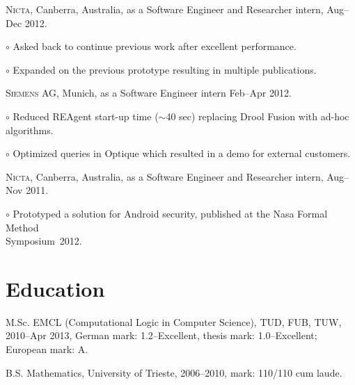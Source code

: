 \documentclass[letterpaper]{article}
\renewenvironment{itemize}{
  \begin{list}{}{
    \setlength{\leftmargin}{1.5em}
  }
}{
  \end{list}
}
\newenvironment{no-indent-itemize}{
  \begin{list}{}{
    \setlength{\leftmargin}{0em}
  }
}{
  \end{list}
}
\def\tilde{$\scriptstyle\sim$}
\def\bullet{$\circ$\xspace}
\begin{document}
\begin{no-indent-itemize}
  \item \textsc{Nicta}, Canberra, Australia, as a Software Engineer and Researcher intern, Aug--Dec 2012. 
  \begin{itemize}
	\item\bullet Asked back to continue previous work after excellent performance.
	\item\bullet Expanded on the previous prototype resulting in multiple publications.
  \end{itemize}
  \item \textsc{Siemens AG}, Munich, as a Software Engineer intern Feb--Apr 2012.
  \begin{itemize}
	\item\bullet Reduced REAgent start-up time (\tilde 40 sec) replacing Drool Fusion with 
          ad-hoc algorithms.
	\item\bullet Optimized queries in Optique which resulted in a demo for external customers.
  \end{itemize}
  \item \textsc{Nicta}, Canberra, Australia, as a Software Engineer and Researcher intern, Aug--Nov 2011. 
  \begin{itemize}
	\item\bullet Prototyped a solution for Android security, published at the Nasa Formal Method \\
	\phantom{\bullet }Symposium~2012.
  \end{itemize}
\end{no-indent-itemize}

\section*{Education}
\begin{no-indent-itemize}
  \item M.Sc. EMCL (Computational Logic in Computer Science), TUD, FUB, TUW, 2010--Apr 2013, 
        German mark: 1.2--Excellent, thesis mark: 1.0--Excellent; European mark: A.
  \item B.S. Mathematics, University of Trieste, 2006--2010, mark: 110/110 cum laude. 
\end{no-indent-itemize}
\end{document}
